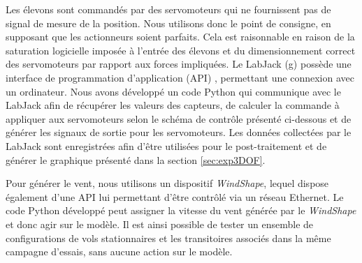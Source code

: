 Les élevons sont commandés par des servomoteurs qui ne fournissent pas de signal de mesure de la position. Nous utilisons donc le point de consigne, en supposant que les actionneurs soient parfaits. Cela est raisonnable en raison de la saturation logicielle imposée à l'entrée des élevons et du dimensionnement correct des servomoteurs par rapport aux forces impliquées. 
Le LabJack (g) possède une interface de programmation d'application (API) , permettant une connexion avec un ordinateur. Nous avons développé un code Python qui communique avec le LabJack afin de récupérer les valeurs des capteurs, de calculer la commande à appliquer aux servomoteurs selon le schéma de contrôle présenté ci-dessous et de générer les signaux de sortie pour les servomoteurs. Les données collectées par le LabJack sont enregistrées afin d'être utilisées pour le post-traitement et de générer le graphique présenté dans la section \ref{sec:exp3DOF}. 

Pour générer le vent, nous utilisons un dispositif \textit{WindShape}, lequel dispose également d'une API lui permettant d'être contrôlé via un réseau Ethernet. Le code Python développé peut assigner la vitesse du vent générée par le \textit{WindShape} et donc agir sur le modèle. Il est ainsi possible de tester un ensemble de configurations de vols stationnaires et les transitoires associés dans la même campagne d'essais, sans aucune action sur le modèle. 


